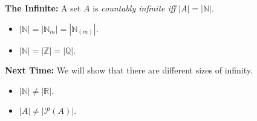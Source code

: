 \documentclass[handout]{beamer}
\newcommand{\abs}[1]{|#1|} %
\newcommand{\N}{\mathbb{N}}
\newcommand{\Z}{\mathbb{Z}}
\newcommand{\Q}{\mathbb{Q}}
\newcommand{\R}{\mathbb{R}}
\renewcommand{\P}{\mathcal{P}}
\begin{document}


\begin{frame}

  \textbf{The Infinite:} A set $A$ is \textit{countably infinite iff} $\abs{A} = \abs{\N}$.

    \begin{itemize}
      \item $\abs{\N} = \abs{\N_m} = \abs{\N_{(m)}}$.  
      \item $\abs{\N} = \abs{\Z} = \abs{\Q}$.
    \end{itemize}
    \vspace{.2in}
    \pause

  \textbf{Next Time:} We will show that there are different sizes of infinity.

    \begin{itemize}
      \item $\abs{\N} \neq \abs{\R}$.
      \item $\abs{A} \neq \abs{\P(A)}$.
    \end{itemize}



\end{frame}


















\end{document}
